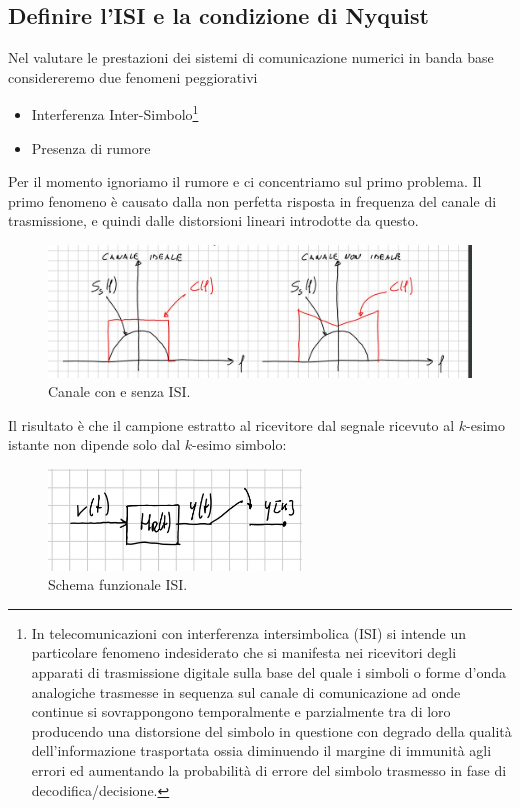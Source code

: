 \documentclass[12pt,oneside,openany]{memoir}
\numberwithin{equation}{subsection}
\begin{document}
\subsection{Definire l'ISI e la condizione di Nyquist}
Nel valutare le prestazioni dei sistemi di comunicazione numerici in banda base
considereremo due fenomeni peggiorativi
\begin{itemize}
    \item Interferenza Inter-Simbolo\footnote{In telecomunicazioni con
        interferenza intersimbolica (ISI) si intende un particolare fenomeno
        indesiderato che si manifesta nei ricevitori degli apparati di
        trasmissione digitale sulla base del quale i simboli o forme d'onda
        analogiche trasmesse in sequenza sul canale di comunicazione ad onde
        continue si sovrappongono temporalmente e parzialmente tra di loro
        producendo una distorsione del simbolo in questione con degrado della
        qualit\`a dell'informazione trasportata ossia diminuendo il margine di
        immunit\`a agli errori ed aumentando la probabilit\`a di errore del
        simbolo trasmesso in fase di decodifica/decisione.}
    \item Presenza di rumore
\end{itemize}
Per il momento ignoriamo il rumore e ci concentriamo sul primo problema.
\bigbreak
Il primo fenomeno \`e causato dalla non perfetta risposta in frequenza del
canale di trasmissione, e quindi dalle distorsioni lineari introdotte da
questo.
\begin{figure}[H]
    \centering
    \captionsetup{justification=centering}
    \includegraphics[width=1.0\textwidth]{images/isi.jpg}
    \caption{Canale con e senza ISI.}
\end{figure}
Il risultato \`e che il campione estratto al ricevitore dal segnale ricevuto al
$k$-esimo istante non dipende solo dal $k$-esimo simbolo:
\begin{figure}[H]
    \centering
    \captionsetup{justification=centering}
    \includegraphics[width=0.6\textwidth]{images/isi_scheme.jpg}
    \caption{Schema funzionale ISI.}
\end{figure}
\end{document}
